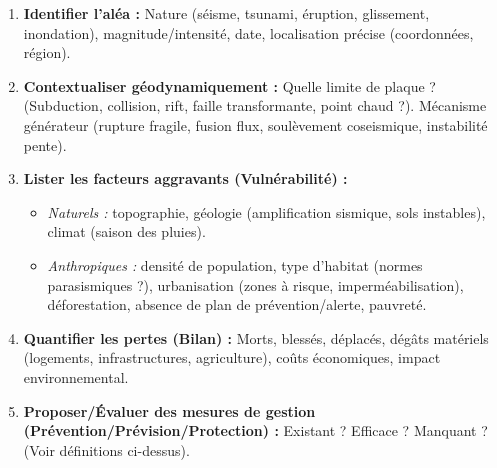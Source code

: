 \documentclass[11pt]{article}
\begin{document}
\begin{methode}
\begin{enumerate}
    \item \textbf{Identifier l'aléa :} Nature (séisme, tsunami, éruption, glissement, inondation), magnitude/intensité, date, localisation précise (coordonnées, région).
    \item \textbf{Contextualiser géodynamiquement :} Quelle limite de plaque ? (Subduction, collision, rift, faille transformante, point chaud ?). Mécanisme générateur (rupture fragile, fusion flux, soulèvement coseismique, instabilité pente).
    \item \textbf{Lister les facteurs aggravants (Vulnérabilité) :}
    \begin{itemize}
        \item \textit{Naturels :} topographie, géologie (amplification sismique, sols instables), climat (saison des pluies).
        \item \textit{Anthropiques :} densité de population, type d'habitat (normes parasismiques ?), urbanisation (zones à risque, imperméabilisation), déforestation, absence de plan de prévention/alerte, pauvreté.
    \end{itemize}
    \item \textbf{Quantifier les pertes (Bilan) :} Morts, blessés, déplacés, dégâts matériels (logements, infrastructures, agriculture), coûts économiques, impact environnemental.
    \item \textbf{Proposer/Évaluer des mesures de gestion (Prévention/Prévision/Protection) :} Existant ? Efficace ? Manquant ? (Voir définitions ci-dessus).
\end{enumerate}
\end{methode}
\end{document}
